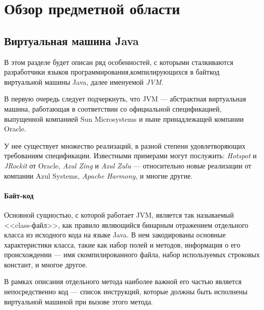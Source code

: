 \section{Обзор предметной области}

\subsection{Виртуальная машина Java}

В этом разделе будет описан ряд особенностей, с которыми сталкиваются разработчики языков
программирования,компилирующихся в байткод виртуальной машины Java, далее именуемой \textit{JVM}.

В первую очередь следует подчеркнуть, что JVM --- абстрактная виртуальная машина, работающая
в соответствии со официальной спецификацией\cite{JVMSpec}, выпущенной компанией Sun Microsystems и ныне
принадлежащей компании Oracle.

У нее существует множество реализаций, в разной степени удовлетворяющих требованиям спецификации.
Известными примерами могут послужить: \textit{Hotspot} и \textit{JRockit} от Oracle, \textit{Azul Zing}
и \textit{Azul Zulu} --- относительно новые реализации от компании Azul Systems, \textit{Apache Harmony},
и многие другие.

\paragraph{Байт-код}

Основной сущностью, с которой работает JVM, является так называемый <<class-файл>>, как правило являющийся
бинарным отражением отдельного класса из исходного кода на языке Java. В нем закодированы основные
характеристики класса, такие как набор полей и методов, информация о его происхождении --- имя
скомпилированного файла, набор используемых строковых констант, и многое другое.

В рамках описания отдельного метода наиболее важной его частью является непосредственно код --- список
инструкций, которые должны быть исполнены виртуальной машиной при вызове этого метода.

